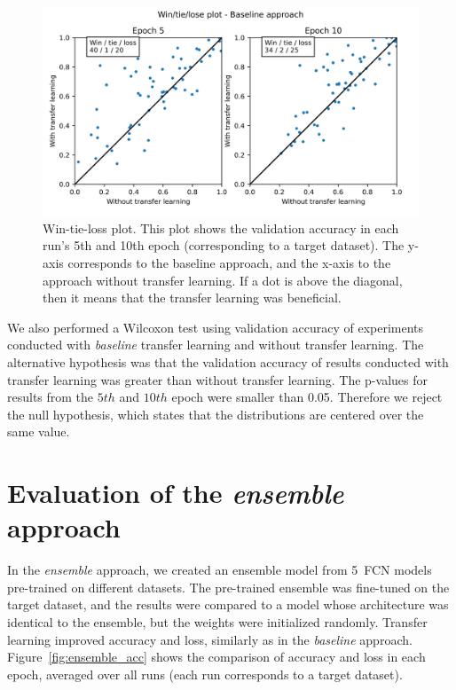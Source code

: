 \documentclass[a4paper,11pt,twoside]{report}
\theoremstyle{definition}
\begin{document}
\FloatBarrier
\begin{figure}[h!t]
\centering
\includegraphics[width=17 cm]{imgs/baseline/win_tie_lose_epoch.png}
\caption{Win-tie-loss plot. This plot shows the validation accuracy in each run's 5th and 10th epoch (corresponding to a target dataset). The y-axis corresponds to the baseline approach, and the x-axis to the approach without transfer learning. If a dot is above the diagonal, then it means that the transfer learning was beneficial.}
\label{fig:win_tie_loss_baseline}
\end{figure}

\FloatBarrier
We also performed a Wilcoxon test using validation accuracy of experiments conducted with \textit{baseline} transfer learning and without transfer learning. The alternative hypothesis was that the validation accuracy of results conducted with transfer learning was greater than without transfer learning. The p-values for results from the $5th$ and $10th$ epoch were smaller than 0.05. Therefore we reject the null hypothesis, which states that the distributions are centered over the same value.

\section{Evaluation of the \textit{ensemble} approach}
In the \textit{ensemble} approach, we created an ensemble model from 5~FCN models pre-trained on different datasets. The pre-trained ensemble was fine-tuned on the target dataset, and the results were compared to a model whose architecture was identical to the ensemble, but the weights were initialized randomly. Transfer learning improved accuracy and loss, similarly as in the \textit{baseline} approach. Figure~\ref{fig:ensemble_acc} shows the comparison of accuracy and loss in each epoch, averaged over all runs (each run corresponds to a target dataset).
\end{document}
